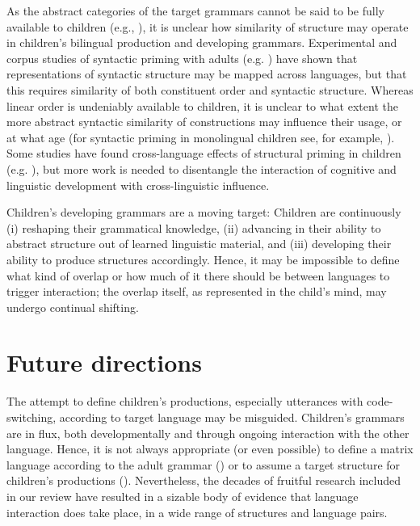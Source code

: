 \documentclass[output=paper]{langscibook}
\begin{document}
As the abstract categories of the target grammars cannot be said to be fully available to children (e.g., \citealt{Ambridge2020}), it is unclear how similarity of structure may operate in children’s bilingual production and developing grammars. Experimental and corpus studies of syntactic priming with adults (e.g. \citealt{Kootstra2012,Travis2017}) have shown that representations of syntactic structure may be mapped across languages, but that this requires similarity of both constituent order and syntactic structure. Whereas linear order is undeniably available to children, it is unclear to what extent the more abstract syntactic similarity of constructions may influence their usage, or at what age (for syntactic priming in monolingual children see, for example, \citealt{Rowland2012,PeterEtAl2015,BraniganMcLean2016}). Some studies have found cross-language effects of structural priming in children (e.g. \citealt{Herve2016,Vasilyeva2010,Wolleb2018}), but more work is needed to disentangle the interaction of cognitive and linguistic development with cross-linguistic influence.

Children’s developing grammars are a moving target: Children are continuously (i) reshaping their grammatical knowledge, (ii) advancing in their ability to abstract structure out of learned linguistic material, and (iii) developing their ability to produce structures accordingly. Hence, it may be impossible to define what kind of overlap or how much of it there should be between languages to trigger interaction; the overlap itself, as represented in the child’s mind, may undergo continual shifting.

\section{Future directions}

The attempt to define children’s productions, especially utterances with code-switching, according to target language may be misguided. Children’s grammars are in flux, both developmentally and through ongoing interaction with the other language. Hence, it is not always appropriate (or even possible) to define a matrix language according to the adult grammar (\citealt{Vihman2018}) or to assume a target structure for children’s productions (\citealt{YipMatthews2016}). Nevertheless, the decades of fruitful research included in our review have resulted in a sizable body of evidence that language interaction does take place, in a wide range of structures and language pairs.
\end{document}
